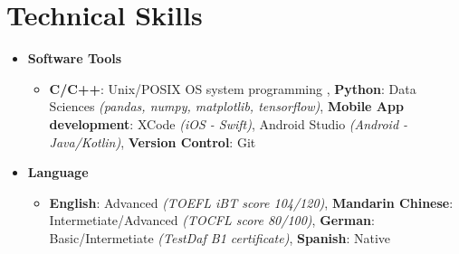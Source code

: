 \section{\sectionheading Technical Skills}

\begin{itemize}[leftmargin=0pt, label={}]%

\item{
{\sectionheading\large{\textbf{Software Tools}}}

    \vspace{-6pt}
    \begin{itemize}[label=\textbullet, leftmargin=*, noitemsep]
        \item{\textbf{C/C++}: Unix/POSIX OS system programming \textit{}, \textbf{Python}: Data Sciences \textit{(pandas, numpy, matplotlib, tensorflow)}, \textbf{Mobile App development}: XCode \textit{(iOS - Swift)}, Android Studio \textit{(Android - Java/Kotlin)}, \textbf{Version Control}: Git}
    \end{itemize}
}

\item{
{\sectionheading\large{\textbf{Language}}}

    \vspace{-6pt}
    \begin{itemize}[label=\textbullet, leftmargin=*, noitemsep]
        \item{\textbf{English}: Advanced \textit{(TOEFL iBT score 104/120)}, \textbf{Mandarin Chinese}: Intermetiate/Advanced \textit{(TOCFL score 80/100)}, \textbf{German}: Basic/Intermetiate \textit{(TestDaf B1 certificate)}, \textbf{Spanish}: Native}
    \end{itemize}
}
\end{itemize}
